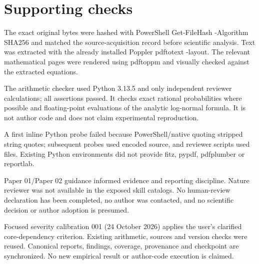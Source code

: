 \documentclass[10pt]{article}
\begin{document}
\section*{Supporting checks}
The exact original bytes were hashed with PowerShell Get-FileHash -Algorithm SHA256 and matched the source-acquisition record before scientific analysis. Text was extracted with the already installed Poppler pdftotext -layout. The relevant mathematical pages were rendered using pdftoppm and visually checked against the extracted equations.\par
The arithmetic checker used Python 3.13.5 and only independent reviewer calculations; all assertions passed. It checks exact rational probabilities where possible and floating-point evaluations of the analytic log-normal formula. It is not author code and does not claim experimental reproduction.\par
A first inline Python probe failed because PowerShell/native quoting stripped string quotes; subsequent probes used encoded source, and reviewer scripts used files. Existing Python environments did not provide fitz, pypdf, pdfplumber or reportlab.\par
Paper 01/Paper 02 guidance informed evidence and reporting discipline. Nature reviewer was not available in the exposed skill catalogs. No human-review declaration has been completed, no author was contacted, and no scientific decision or author adoption is presumed.\par
Focused severity calibration 001 (24 October 2026) applies the user’s clarified core-dependency criterion. Existing arithmetic, sources and version checks were reused. Canonical reports, findings, coverage, provenance and checkpoint are synchronized. No new empirical result or author-code execution is claimed.\par
\end{document}
